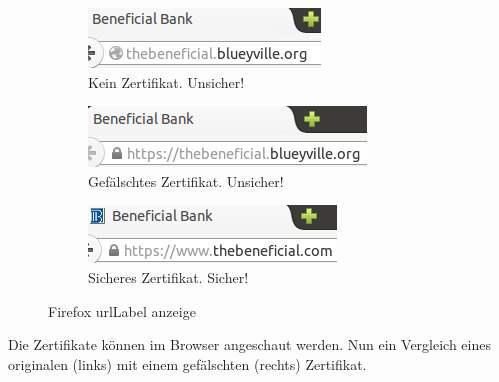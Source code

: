 \begin{figure}[htb]
  \begin{subfigure}[b]{.30\linewidth}
    \centering
    \includegraphics[width=0.9\linewidth]{images/https-firefox-none.png}
    \caption{Kein Zertifikat. Unsicher!}
    \label{fig:phishing:angriffvorbereiten:angriffsvektoren:fakecertificates:firefox:none}
  \end{subfigure}%
    \begin{subfigure}[b]{.30\linewidth}
      \centering
      \includegraphics[width=0.9\linewidth]{images/https-firefox-fake.png}
      \caption{Gefälschtes Zertifikat. Unsicher!}
      \label{fig:phishing:angriffvorbereiten:angriffsvektoren:fakecertificates:firefox:secure}
    \end{subfigure}
	\begin{subfigure}[b]{.30\linewidth}
		\centering
		\includegraphics[width=0.9\linewidth]{images/https-firefox-secure.png}
		\caption{Sicheres Zertifikat. Sicher!}
		\label{fig:phishing:angriffvorbereiten:angriffsvektoren:fakecertificates:firefox:secure}
	\end{subfigure}
  \caption{Firefox \Gls{urlLabel} anzeige}
  \label{fig:phishing:angriffvorbereiten:angriffsvektoren:fakecertificates:firefox}
\end{figure}

Die Zertifikate können im Browser angeschaut werden. Nun ein Vergleich eines originalen (links) mit einem gefälschten (rechts) Zertifikat.

